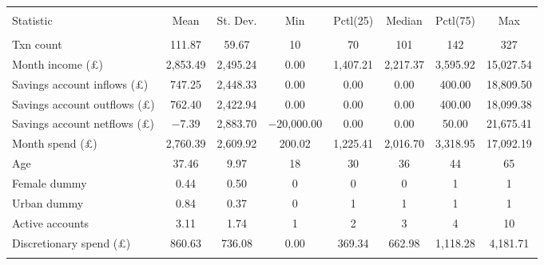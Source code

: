 
\begin{tabular}{@{\extracolsep{5pt}}lccccccc} 
\\[-1.8ex]\hline 
\hline \\[-1.8ex] 
Statistic & \multicolumn{1}{c}{Mean} & \multicolumn{1}{c}{St. Dev.} & \multicolumn{1}{c}{Min} & \multicolumn{1}{c}{Pctl(25)} & \multicolumn{1}{c}{Median} & \multicolumn{1}{c}{Pctl(75)} & \multicolumn{1}{c}{Max} \\ 
\hline \\[-1.8ex] 
Txn count & 111.87 & 59.67 & 10 & 70 & 101 & 142 & 327 \\ 
Month income (\pounds) & 2,853.49 & 2,495.24 & 0.00 & 1,407.21 & 2,217.37 & 3,595.92 & 15,027.54 \\ 
Savings account inflows (\pounds) & 747.25 & 2,448.33 & 0.00 & 0.00 & 0.00 & 400.00 & 18,809.50 \\ 
Savings account outflows (\pounds) & 762.40 & 2,422.94 & 0.00 & 0.00 & 0.00 & 400.00 & 18,099.38 \\ 
Savings account netflows (\pounds) & $-$7.39 & 2,883.70 & $-$20,000.00 & 0.00 & 0.00 & 50.00 & 21,675.41 \\ 
Month spend (\pounds) & 2,760.39 & 2,609.92 & 200.02 & 1,225.41 & 2,016.70 & 3,318.95 & 17,092.19 \\ 
Age & 37.46 & 9.97 & 18 & 30 & 36 & 44 & 65 \\ 
Female dummy & 0.44 & 0.50 & 0 & 0 & 0 & 1 & 1 \\ 
Urban dummy & 0.84 & 0.37 & 0 & 1 & 1 & 1 & 1 \\ 
Active accounts & 3.11 & 1.74 & 1 & 2 & 3 & 4 & 10 \\ 
Discretionary spend (\pounds) & 860.63 & 736.08 & 0.00 & 369.34 & 662.98 & 1,118.28 & 4,181.71 \\ 
\hline \\[-1.8ex] 
\end{tabular} 
